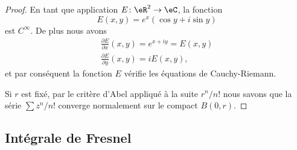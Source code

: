 \begin{proof}
	En tant que application \( E\colon \eR^2\to \eC\), la fonction
	\begin{equation}
		E(x,y)=e^x(\cos y+i\sin y)
	\end{equation}
	est \( C^{\infty}\). De plus nous avons
	\begin{subequations}
		\begin{align}
			\frac{ \partial E }{ \partial x }(x,y)= e^{x+iy}=E(x,y) \\
			\frac{ \partial E }{ \partial y }(x,y)=iE(x,y),
		\end{align}
	\end{subequations}
	et par conséquent la fonction \( E\) vérifie les équations de Cauchy-Riemann.

	Si \( r\) est fixé, par le critère d'Abel appliqué à la suite \(r^n/n!\) nous savons que la série \( \sum z^n/n!\) converge normalement sur le compact \( B(0,r)\).
\end{proof}

\subsection{Intégrale de Fresnel}

